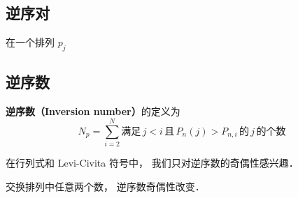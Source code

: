 
\begin{issues}
\issueDraft
\end{issues}


\subsection{逆序对}
在一个排列 $p_{j}$

\subsection{逆序数}
\textbf{逆序数（Inversion number）}的定义为
\begin{equation}\label{InvNum_eq5}
N_p = \sum_{i=2}^N \text{满足}\, j<i \,\text{且}\, P_n(j) > P_{n,i} \, \text{的}\, j\, \text{的个数} 
\end{equation}

在行列式和 Levi-Civita 符号中， 我们只对逆序数的奇偶性感兴趣．

交换排列中任意两个数， 逆序数奇偶性改变．
